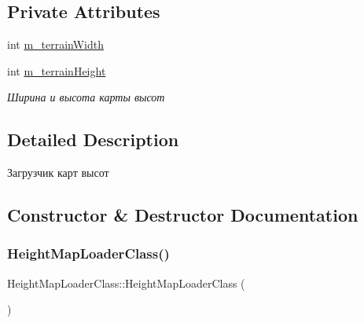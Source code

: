 \subsection*{Private Attributes}
\begin{DoxyCompactItemize}
\item 
int \hyperlink{class_height_map_loader_class_aa1cc45b7f99736e979546d0fb15c3e9b}{m\+\_\+terrain\+Width}
\item 
int \hyperlink{class_height_map_loader_class_ae05731d557fcfd4371a9d230d720090e}{m\+\_\+terrain\+Height}
\begin{DoxyCompactList}\small\item\em Ширина и высота карты высот \end{DoxyCompactList}\end{DoxyCompactItemize}


\subsection{Detailed Description}
Загрузчик карт высот 

\subsection{Constructor \& Destructor Documentation}
\mbox{\label{class_height_map_loader_class_a23d62d515602dca8fbaf826704e4d479}} 
\subsubsection{\texorpdfstring{Height\+Map\+Loader\+Class()}{HeightMapLoaderClass()}\hspace{0.1cm}{\footnotesize\ttfamily [1/2]}}
{\footnotesize\ttfamily Height\+Map\+Loader\+Class\+::\+Height\+Map\+Loader\+Class (\begin{DoxyParamCaption}{ }\end{DoxyParamCaption})}

\mbox{\label{class_height_map_loader_class_a6efab3bc5ca2feb5bc1f250eb22ceeeb}} 
